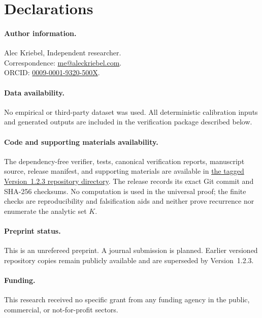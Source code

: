 \section*{Declarations}

\paragraph{Author information.}
Alec Kriebel, Independent researcher.\\
Correspondence: \mbox{\href{mailto:me@aleckriebel.com}{me@aleckriebel.com}}.\\
ORCID: \href{https://orcid.org/0009-0001-9320-500X}{0009-0001-9320-500X}.

\paragraph{Data availability.}
No empirical or third-party dataset was used.  All deterministic calibration
inputs and generated outputs are included in the verification package
described below.

\paragraph{Code and supporting materials availability.}
The dependency-free verifier, tests, canonical verification reports,
manuscript source, release manifest, and supporting materials are available in
\href{https://github.com/AlecKriebel/Math/tree/bimolecular-positive-recurrence-v1.2.3/bimolecular_positive_recurrence_submission_v1_2_3}{the tagged Version~1.2.3 repository directory}.
The release records its exact Git commit and SHA-256 checksums.  No computation
is used in the universal proof; the finite checks are reproducibility and
falsification aids and neither prove recurrence nor enumerate the analytic set
\(K\).

\paragraph{Preprint status.}
This is an unrefereed preprint.  A journal submission is planned.  Earlier
versioned repository copies remain publicly available and are superseded by
Version~1.2.3.

\paragraph{Funding.}
This research received no specific grant from any funding agency in the public,
commercial, or not-for-profit sectors.

